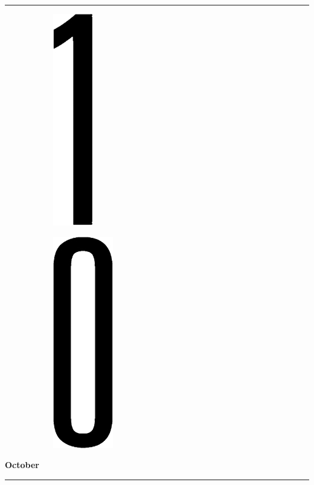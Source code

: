 
\rule{\linewidth}{0.1cm} \par
\begin{figure}[H]
  \begin{subfigure}[l]{0.15\textwidth}
    \includegraphics[height=0.35\textheight]{Sources/PortalNumbers/1.jpg}
  \end{subfigure}
  \begin{subfigure}[l]{0.5\textwidth}
    \includegraphics[height=0.35\textheight]{Sources/PortalNumbers/0.jpg}
  \end{subfigure}
  
\end{figure}

 \hfill \sffamily\textbf{\fontsize{16}{20}\selectfont October} \par
\rule{\linewidth}{0.1cm} \par

